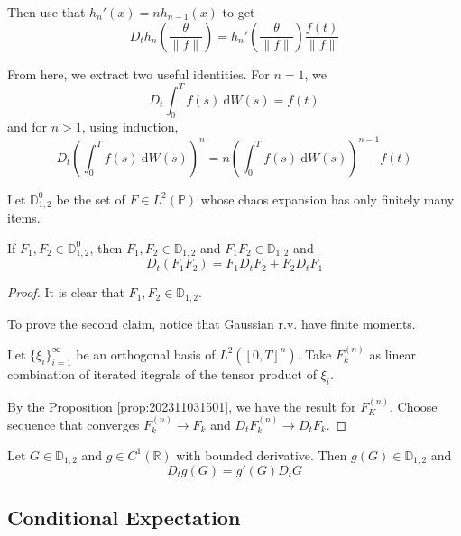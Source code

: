 Then use that $h_n'(x) = n h_{n-1}(x)$ to get 
\begin{equation}\label{eq:202310241449}
	D_t h_n \left( \frac{\theta}{\| f \|} \right) = h_n' \left( \frac{\theta}{\| f \|} \right) \frac{f(t)}{\| f \|}
\end{equation}

From here, we extract two useful identities. For $n = 1$, we
\begin{equation*}
	D_t \int_0^T f(s) ~\mathrm{d}W(s) = f(t)
\end{equation*}
and for $n > 1$, using induction,
\begin{equation*}
	D_t \left( \int_0^T f(s) ~\mathrm{d}W(s) \right)^n = n \left( \int_0^T f(s) ~\mathrm{d}W(s) \right)^{n-1} f(t)
\end{equation*}

Let $\mathbb{D}_{1,2}^0$ be the set of $F \in L^2(\mathbb{P})$ whose chaos expansion has only finitely many items.

\begin{theorem}\label{thm:product_rule}
	If $F_1, F_2 \in \mathbb{D}_{1,2}^0$, then $F_1, F_2 \in \mathbb{D}_{1,2}$ and $F_1 F_2 \in \mathbb{D}_{1,2}$ and 
	$$
	D_t(F_1 F_2) = F_1 D_t F_2 + F_2 D_t F_1
	$$
\end{theorem}

\begin{proof}
	It is clear that $F_1, F_2 \in \mathbb{D}_{1,2}$. 

	To prove the second claim, notice that Gaussian r.v. have finite moments.

	Let $\{ \xi_i \}_{i=1}^\infty$ be an orthogonal basis of $L^2([0,T]^n)$. Take $F_k^{(n)}$ as linear combination of iterated itegrals of the tensor product of $\xi_i$. 

	By the Proposition \ref{prop:202311031501}, we have the result for $F_K^{(n)}$. Choose sequence that converges $F_k^{(n)} \to F_k$ and $D_t F_k^{(n)} \to D_t F_k$. 
\end{proof}

\begin{theorem}
	Let $G \in \mathbb{D}_{1,2}$ and $g \in C^1(\mathbb{R})$ with bounded derivative. Then $g(G) \in \mathbb{D}_{1,2}$ and
	\begin{equation}
		D_t g(G) = g'(G) D_t G
	\end{equation}
\end{theorem}

\subsection{Conditional Expectation}

